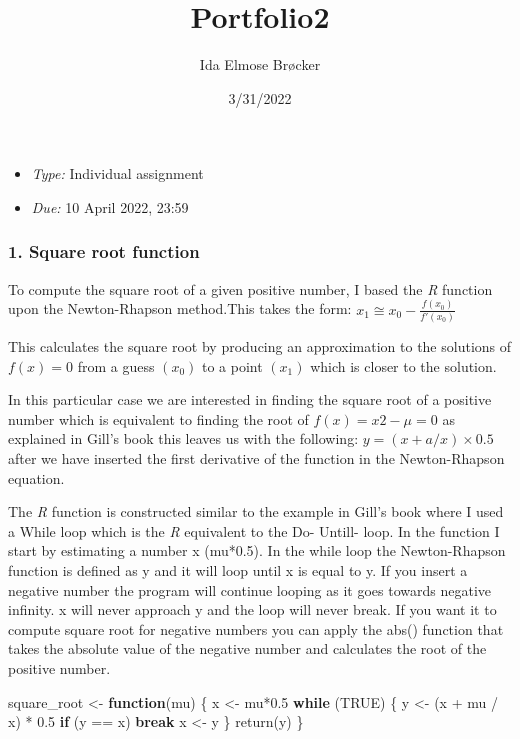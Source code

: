 \documentclass[
]{article}
\title{Portfolio2}
\author{Ida Elmose Brøcker}
\date{3/31/2022}
\newenvironment{Shaded}{\begin{snugshade}}{\end{snugshade}}
\newcommand{\ConstantTok}[1]{\textcolor[rgb]{0.00,0.00,0.00}{#1}}
\newcommand{\ControlFlowTok}[1]{\textcolor[rgb]{0.13,0.29,0.53}{\textbf{#1}}}
\newcommand{\FloatTok}[1]{\textcolor[rgb]{0.00,0.00,0.81}{#1}}
\newcommand{\FunctionTok}[1]{\textcolor[rgb]{0.00,0.00,0.00}{#1}}
\newcommand{\NormalTok}[1]{#1}
\newcommand{\OtherTok}[1]{\textcolor[rgb]{0.56,0.35,0.01}{#1}}
\newcommand{\SpecialCharTok}[1]{\textcolor[rgb]{0.00,0.00,0.00}{#1}}
\providecommand{\tightlist}{%
  \setlength{\itemsep}{0pt}\setlength{\parskip}{0pt}}
\begin{document}
\maketitle

\begin{itemize}
\tightlist
\item
  \emph{Type:} Individual assignment
\item
  \emph{Due:} 10 April 2022, 23:59
\end{itemize}

\hypertarget{square-root-function}{%
\subsubsection{1. Square root function}\label{square-root-function}}

To compute the square root of a given positive number, I based the
\emph{R} function upon the Newton-Rhapson method.This takes the form:
\(x_1 \cong x_0 - \frac {f(x_0)}{f'(x_0)}\)

This calculates the square root by producing an approximation to the
solutions of \(f(x) = 0\) from a guess \((x_0)\) to a point \((x_1)\)
which is closer to the solution.

In this particular case we are interested in finding the square root of
a positive number which is equivalent to finding the root of
\(f(x) = x2 − \mu = 0\) as explained in Gill's book this leaves us with
the following: \(y = (x + a / x) \times 0.5\) after we have inserted the
first derivative of the function in the Newton-Rhapson equation.

The \emph{R} function is constructed similar to the example in Gill's
book where I used a While loop which is the \emph{R} equivalent to the
Do- Untill- loop. In the function I start by estimating a number x
(mu*0.5). In the while loop the Newton-Rhapson function is defined as y
and it will loop until x is equal to y. If you insert a negative number
the program will continue looping as it goes towards negative infinity.
x will never approach y and the loop will never break. If you want it to
compute square root for negative numbers you can apply the abs()
function that takes the absolute value of the negative number and
calculates the root of the positive number.

\begin{Shaded}
\begin{Highlighting}[]
\NormalTok{square\_root }\OtherTok{\textless{}{-}} \ControlFlowTok{function}\NormalTok{(mu) \{}
\NormalTok{  x }\OtherTok{\textless{}{-}}\NormalTok{ mu}\SpecialCharTok{*}\FloatTok{0.5}
  \ControlFlowTok{while}\NormalTok{ (}\ConstantTok{TRUE}\NormalTok{) \{}
\NormalTok{    y }\OtherTok{\textless{}{-}}\NormalTok{ (x }\SpecialCharTok{+}\NormalTok{ mu }\SpecialCharTok{/}\NormalTok{ x) }\SpecialCharTok{*} \FloatTok{0.5}
    \ControlFlowTok{if}\NormalTok{ (y }\SpecialCharTok{==}\NormalTok{ x) }\ControlFlowTok{break}
\NormalTok{    x }\OtherTok{\textless{}{-}}\NormalTok{ y}
\NormalTok{  \} }
  \FunctionTok{return}\NormalTok{(y)}
\NormalTok{\}}
\end{Highlighting}
\end{Shaded}
\end{document}
